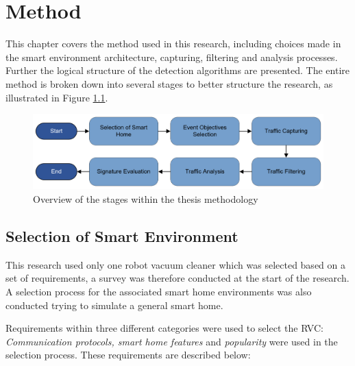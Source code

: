 \chapter{Method}
\label{cap:Method}
This chapter covers the method used in this research, including choices made in the smart environment architecture, capturing, filtering and analysis processes. Further the logical structure of the detection algorithms are presented. The entire method is broken down into several stages to better structure the research, as illustrated in Figure \ref{fig:Method_process}.  

\begin{figure}[H]
    \centering
    \includegraphics[width=\textwidth]{figures/Method_process.png}
    \caption{Overview of the stages within the thesis methodology}
    \label{fig:Method_process}
\end{figure}



\section{Selection of Smart Environment}
This research used only one robot vacuum cleaner which was selected based on a set of requirements, a survey was therefore conducted at the start of the research. A selection process for the associated smart home environments was also conducted trying to simulate a general smart home.

Requirements within three different categories were used to select the \gls{RVC}: \textit{Communication protocols, smart home features} and \textit{popularity} were used in the selection process. These requirements are described below:  

